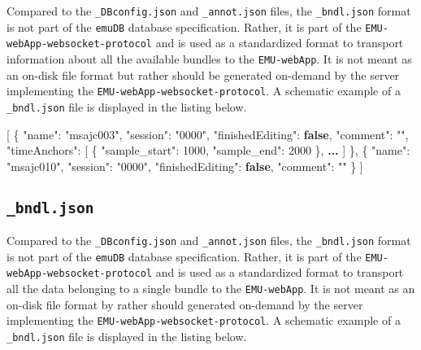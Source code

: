 \documentclass[
]{book}
\newenvironment{Shaded}{\begin{snugshade}}{\end{snugshade}}
\newcommand{\DataTypeTok}[1]{\textcolor[rgb]{0.13,0.29,0.53}{#1}}
\newcommand{\DecValTok}[1]{\textcolor[rgb]{0.00,0.00,0.81}{#1}}
\newcommand{\ErrorTok}[1]{\textcolor[rgb]{0.64,0.00,0.00}{\textbf{#1}}}
\newcommand{\FunctionTok}[1]{\textcolor[rgb]{0.00,0.00,0.00}{#1}}
\newcommand{\KeywordTok}[1]{\textcolor[rgb]{0.13,0.29,0.53}{\textbf{#1}}}
\newcommand{\OtherTok}[1]{\textcolor[rgb]{0.56,0.35,0.01}{#1}}
\newcommand{\StringTok}[1]{\textcolor[rgb]{0.31,0.60,0.02}{#1}}
\begin{document}
Compared to the \texttt{\_DBconfig.json} and \texttt{\_annot.json} files, the \texttt{\_bndl.json} format is not part of the \texttt{emuDB} database specification. Rather, it is part of the \texttt{EMU-webApp-websocket-protocol} and is used as a standardized format to transport information about all the available bundles to the \texttt{EMU-webApp}. It is not meant as an on-disk file format but rather should be generated on-demand by the server implementing the \texttt{EMU-webApp-websocket-protocol}. A schematic example of a \texttt{\_bndl.json} file is displayed in the listing below.

\begin{Shaded}
\begin{Highlighting}[]
\OtherTok{[}
  \FunctionTok{\{}
  \DataTypeTok{"name"}\FunctionTok{:} \StringTok{"msajc003"}\FunctionTok{,}
  \DataTypeTok{"session"}\FunctionTok{:} \StringTok{"0000"}\FunctionTok{,}
  \DataTypeTok{"finishedEditing"}\FunctionTok{:} \KeywordTok{false}\FunctionTok{,}
  \DataTypeTok{"comment"}\FunctionTok{:} \StringTok{""}\FunctionTok{,}
  \DataTypeTok{"timeAnchors"}\FunctionTok{:} \OtherTok{[}
    \FunctionTok{\{}
      \DataTypeTok{"sample\_start"}\FunctionTok{:} \DecValTok{1000}\FunctionTok{,}
      \DataTypeTok{"sample\_end"}\FunctionTok{:} \DecValTok{2000}
    \FunctionTok{\}}\OtherTok{,} \ErrorTok{...}
  \OtherTok{]}
  \FunctionTok{\}}\OtherTok{,}
  \FunctionTok{\{}
  \DataTypeTok{"name"}\FunctionTok{:} \StringTok{"msajc010"}\FunctionTok{,}
  \DataTypeTok{"session"}\FunctionTok{:} \StringTok{"0000"}\FunctionTok{,}
  \DataTypeTok{"finishedEditing"}\FunctionTok{:} \KeywordTok{false}\FunctionTok{,}
  \DataTypeTok{"comment"}\FunctionTok{:} \StringTok{""}
  \FunctionTok{\}}
\OtherTok{]}
\end{Highlighting}
\end{Shaded}

\hypertarget{subsec:app-chapExampleFilesBndlJSON}{%
\subsection{\texorpdfstring{\texttt{\_bndl.json}}{\_bndl.json}}\label{subsec:app-chapExampleFilesBndlJSON}}

Compared to the \texttt{\_DBconfig.json} and \texttt{\_annot.json} files, the \texttt{\_bndl.json} format is not part of the \texttt{emuDB} database specification. Rather, it is part of the \texttt{EMU-webApp-websocket-protocol} and is used as a standardized format to transport all the data belonging to a single bundle to the \texttt{EMU-webApp}. It is not meant as an on-disk file format by rather should generated on-demand by the server implementing the \texttt{EMU-webApp-websocket-protocol}. A schematic example of a \texttt{\_bndl.json} file is displayed in the listing below.
\end{document}
